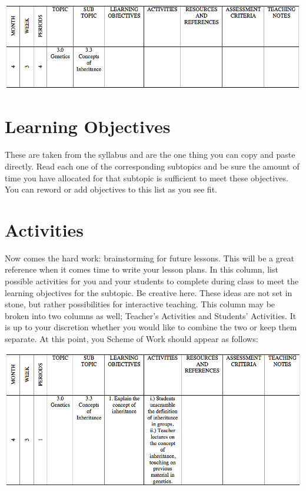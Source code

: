 \begin{flushleft}
\includegraphics[scale=0.65]{./img/picture-2.png} 
\end{flushleft}

\section{Learning Objectives}
These are taken from the syllabus and are the one thing you can copy and paste directly.  Read each one of the corresponding subtopics and be sure the amount of time you have allocated for that subtopic is sufficient to meet these objectives.  You can reword or add objectives to this list as you see fit.

\section{Activities}
Now comes the hard work: brainstorming for future lessons.  This will be a great reference when it comes time to write your lesson plans.  In this column, list possible activities for you and your students to complete during class to meet the learning objectives for the subtopic.  Be creative here.  These ideas are not set in stone, but rather possibilities for interactive teaching.  This column may be broken into two columns as well; Teacher's Activities and Students' Activities. It is up to your discretion whether you would like to combine the two or keep them separate. At this point, you Scheme of Work should appear as follows:

\begin{flushleft}
\includegraphics[scale=0.65]{./img/picture-3.png} 
\end{flushleft}

